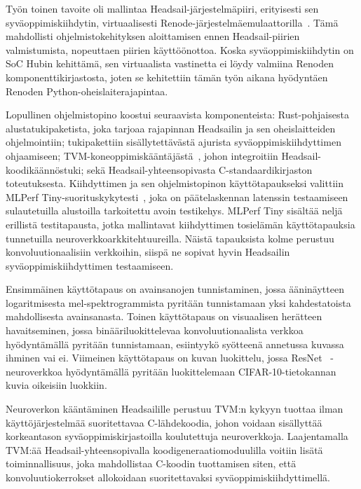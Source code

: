 \documentclass[12pt,a4paper,finnish
]{tunithesis}
\begin{document}
Työn toinen tavoite oli mallintaa Headsail-järjestelmäpiiri, erityisesti sen sy\-vä\-op\-pi\-mis\-kiih\-dy\-tin, virtuaalisesti Renode-järjestelmäemulaattorilla~\cite{renode}.
Tämä mahdollisti ohjelmistokehityksen aloittamisen ennen Headsail-piirien valmistumista, nopeuttaen piirien käyt\-töön\-ot\-to\-a.
Koska syväoppimiskiihdytin on SoC Hubin kehittämä, sen virtuaalista vastinetta ei löydy valmiina Renoden komponenttikirjastosta, joten se kehitettiin tämän työn aikana hyödyntäen Renoden Python-oheislaiterajapintaa.

Lopullinen ohjelmistopino koostui seuraavista komponenteista: Rust-pohjaisesta alustatukipaketista, joka tarjoaa rajapinnan Headsailin ja sen oheislaitteiden ohjelmointiin; tukipakettiin sisällytettävästä ajurista syväoppimiskiihdyttimen ohjaamiseen; TVM-koneoppimiskääntäjästä~\cite{TVM}, johon integroitiin Headsail-koo\-di\-kään\-nös\-tu\-ki; sekä Headsail-yhteensopivasta C-standaardikirjaston toteutuksesta.
Kiihdyttimen ja sen ohjelmistopinon käyttötapaukseksi valittiin MLPerf Tiny-suo\-ri\-tus\-ky\-ky\-tes\-ti~\cite{banbury_mlperf_2021}, joka on päätelaskennan latenssin testaamiseen sulautetuilla alustoilla tarkoitettu avoin testikehys.
MLPerf Tiny sisältää neljä erillistä testitapausta, jotka mallintavat kiihdyttimen tosielämän käyttötapauksia tunnetuilla neuroverkkoarkkitehtuureilla.
Näistä tapauksista kolme perustuu konvoluutionaalisiin verkkoihin, siispä ne sopivat hyvin Headsailin syväoppimiskiihdyttimen testaamiseen.

Ensimmäinen käyttötapaus on avainsanojen tunnistaminen, jossa ääninäytteen logaritmisesta mel-spektrogrammista pyritään tunnistamaan yksi kahdestatoista mahdollisesta avainsanasta.
Toinen käyttötapaus on visuaalisen herätteen havaitseminen, jossa binääriluokittelevaa konvoluutionaalista verkkoa hyödyntämällä pyritään tunnistamaan, esiintyykö syötteenä annetussa kuvassa ihminen vai ei.
Viimeinen käyttötapaus on kuvan luokittelu, jossa ResNet~\cite{he_deep_2015} -neuroverkkoa hyödyntämällä pyritään luokittelemaan CIFAR-10-tietokannan kuvia oikeisiin luokkiin.

Neuroverkon kääntäminen Headsailille perustuu TVM:n kykyyn tuottaa ilman käyttöjärjestelmää suoritettavaa C-lähdekoodia, johon voidaan sisällyttää korkeantason syväoppimiskirjastoilla koulutettuja neuroverkkoja. Laajentamalla TVM:ää Headsail-yhteensopivalla koodigeneraatiomoduulilla voitiin lisätä toiminnallisuus, joka mahdollistaa C-koodin tuottamisen siten, että konvoluutiokerrokset allokoidaan suoritettavaksi syväoppimiskiihdyttimellä.
\end{document}
